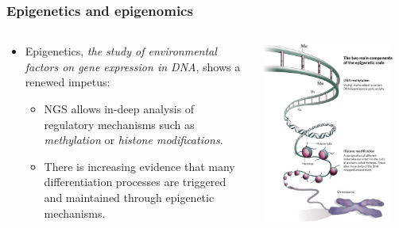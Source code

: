 \documentclass[handout]{beamer}
\begin{document}
\begin{frame}
\frametitle{Epigenetics and epigenomics}
\label{sec-1-7}
\begin{columns}
\begin{column}{.5\linewidth}
\begin{itemize}
\item Epigenetics, \emph{the study of environmental factors on gene expression in DNA}, shows a renewed impetus:
\label{sec-1-7-1}%
\begin{itemize}
\item NGS allows in-deep analysis of regulatory mechanisms such as \emph{methylation} or \emph{histone modifications}.
\label{sec-1-7-1-1}%
\item There is increasing evidence that many differentiation processes are triggered and maintained through epigenetic mechanisms.
\label{sec-1-7-1-2}%
\end{itemize} %
\end{itemize} %
\end{column}
 \begin{column}{.5\linewidth}
\includegraphics[width=0.9\textwidth]{./images/epigeneticsMechanisms.jpg}
 \end{column}
\end{columns}
\end{frame}
\end{document}
